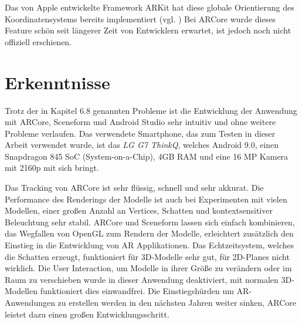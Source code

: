 Das von Apple entwickelte Framework ARKit hat diese globale Orientierung des Koordinatensystems bereits implementiert (vgl. \cite{arkit_global}) Bei ARCore wurde dieses Feature schön seit längerer Zeit von Entwicklern erwartet, ist jedoch noch nicht offiziell erschienen. 

\section{Erkenntnisse}

Trotz der in Kapitel 6.8 genannten Probleme ist die Entwicklung der Anwendung mit ARCore, Sceneform und Android Studio sehr intuitiv und ohne weitere Probleme verlaufen. Das verwendete Smartphone, das zum Testen in dieser Arbeit verwendet wurde, ist das \textit{LG G7 ThinkQ}, welches Android 9.0, einen Snapdragon 845 SoC (System-on-a-Chip), 4GB RAM und eine 16 MP Kamera mit 2160p mit sich bringt. 

Das Tracking von ARCore ist sehr flüssig, schnell und sehr akkurat. Die Performance des Renderings der Modelle ist auch bei Experimenten mit vielen Modellen, einer großen Anzahl an Vertices, Schatten und kontextsensitiver Beleuchtung sehr stabil. ARCore und Sceneform lassen sich einfach kombinieren, das Wegfallen von OpenGL zum Rendern der Modelle, erleichtert zusätzlich den Einstieg in die Entwicklung von AR Applikationen. Das Echtzeitsystem, welches die Schatten erzeugt, funktioniert für 3D-Modelle sehr gut, für 2D-Planes nicht wirklich. Die User Interaction, um Modelle in ihrer Größe zu verändern oder im Raum zu verschieben wurde in dieser Anwendung deaktiviert, mit normalen 3D-Modellen funktioniert dies einwandfrei. Die Einstiegshürden um AR-Anwendungen zu erstellen werden in den nächsten Jahren weiter sinken, ARCore leistet dazu einen großen Entwicklungsschritt.









